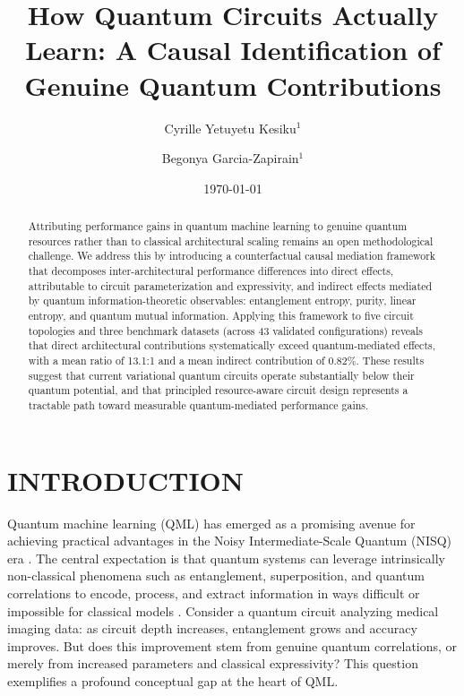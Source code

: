 \documentclass[
    reprint,
    amsmath, amssymb,
    aps,
    floatfix,
    nofootinbib
]{revtex4-1}
\begin{document}
\title{How Quantum Circuits Actually Learn: A Causal Identification of Genuine Quantum Contributions}

\author{Cyrille Yetuyetu Kesiku$^{1}$}

\author{Begonya Garcia-Zapirain$^{1}$}

\date{\today}

\begin{abstract}
Attributing performance gains in quantum machine learning to genuine quantum resources  rather than to classical architectural scaling  remains an open methodological challenge. We address this by introducing a counterfactual causal mediation framework that decomposes inter-architectural performance differences into direct effects, attributable to circuit parameterization and expressivity, and indirect effects mediated by quantum information-theoretic observables: entanglement entropy, purity, linear entropy, and quantum mutual information. Applying this framework to five circuit topologies and three benchmark datasets (across 43 validated configurations) reveals that direct architectural contributions systematically exceed quantum-mediated effects, with a mean ratio of 13.1:1 and a mean indirect contribution of 0.82\%. These results suggest that current variational quantum circuits operate substantially below their quantum potential, and that principled resource-aware circuit design represents a tractable path toward measurable quantum-mediated performance gains.
\end{abstract}

\flushbottom
\maketitle

\thispagestyle{empty}

\section{INTRODUCTION}

Quantum machine learning (QML) \cite{biamonte2017quantum} has emerged as a promising avenue for achieving practical advantages in the Noisy Intermediate-Scale Quantum (NISQ) era \cite{preskill2018quantum}. The central expectation is that quantum systems can leverage intrinsically non-classical phenomena such as entanglement, superposition, and quantum correlations to encode, process, and extract information in ways difficult or impossible for classical models \cite{biamonte2017quantum, huang2022quantum}. Consider a quantum circuit analyzing medical imaging data: as circuit depth increases, entanglement grows and accuracy improves. But does this improvement stem from genuine quantum correlations, or merely from increased parameters and classical expressivity? This question exemplifies a profound conceptual gap at the heart of QML.
\end{document}
